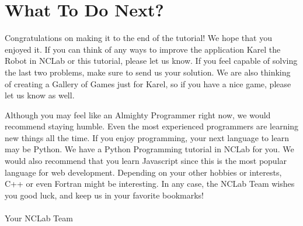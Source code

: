 \documentclass[article,A4,12pt]{llncs}
\begin{document}
\section{What To Do Next?}

Congratulations on making it to the end of the tutorial! We hope that you
enjoyed it. If you can think of any ways to improve the application 
Karel the Robot in NCLab or this tutorial, please let us know. If you 
feel capable of solving the last two problems, make sure to send us your 
solution. We are also thinking of creating a Gallery of Games just for Karel,
so if you have a nice game, please let us know as well. 

Although you may feel like an Almighty Programmer right now, we would
recommend staying humble. Even the most experienced programmers are
learning new things all the time. If you enjoy programming, your next 
language to learn may be Python. We have a Python Programming tutorial
in NCLab for you. We would also recommend that you learn Javascript since this 
is the most popular language for web development. Depending on your 
other hobbies or interests, C++ or even Fortran might be interesting. 
In any case, the NCLab Team wishes you good luck, and keep us in your 
favorite bookmarks!\\
\\
\hbox{} \hfill Your NCLab Team
\end{document}
